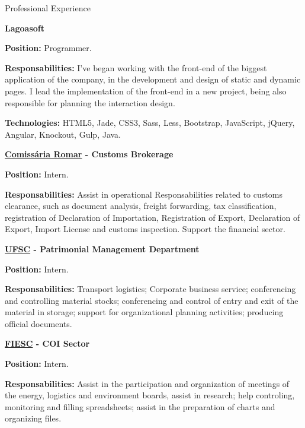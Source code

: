 \begin{rubric}{Professional Experience}{

  \entry*[2016 - Now]
  \textbf{Lagoasoft}

  \textbf{Position:} Programmer.

  \textbf{Responsabilities:} I've began working with the front-end of the biggest application of the company, in the development and design of static and dynamic pages. I lead the implementation of the front-end in a new project, being also responsible for planning the interaction design.
   
  \textbf{Technologies:} HTML5, Jade, CSS3, Sass, Less, Bootstrap, JavaScript, jQuery, Angular,
  Knockout, Gulp, Java.

  \entry*[2014]
  \textbf{\href{http://www.comissariaromar.com.br/}{Comissária Romar}
    - Customs Brokerage}

  \textbf{Position:} Intern.

  \textbf{Responsabilities:} Assist in operational Responsabilities
   related to customs clearance, such as document analysis,
   freight forwarding, tax classification, registration of
   Declaration of Importation, Registration of Export, Declaration of
   Export, Import License and customs inspection. Support the
   financial sector.

  \entry*[2013 - 2014]
  \textbf{\href{http://www.ufsc.br/}{UFSC} - Patrimonial Management
    Department}

  \textbf{Position:} Intern.

  \textbf{Responsabilities:} Transport logistics; Corporate business
   service; conferencing and controlling material stocks;
   conferencing and control of entry and exit of the material in storage;
   support for organizational planning activities; producing
   official documents.


  \entry*[2012 - 2013]
  \textbf{\href{http://www.fiesc.com.br/}{FIESC} - COI Sector}

  \textbf{Position:} Intern.

  \textbf{Responsabilities:} Assist in the participation and organization of
   meetings of the energy, logistics and environment boards, assist
   in research; help controling, monitoring and filling
   spreadsheets; assist in the preparation of charts and organizing
   files.

}\end{rubric}
